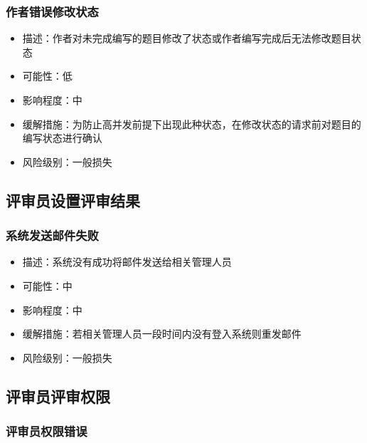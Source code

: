 \documentclass[hyperref, a4paper]{ctexart}
\providecommand{\tightlist}{%
  \setlength{\itemsep}{0pt}\setlength{\parskip}{0pt}}
\begin{document}
\hypertarget{ux4f5cux8005ux9519ux8befux4feeux6539ux72b6ux6001}{%
\subsubsection{作者错误修改状态}\label{ux4f5cux8005ux9519ux8befux4feeux6539ux72b6ux6001}}

\begin{itemize}
\tightlist
\item
  描述：作者对未完成编写的题目修改了状态或作者编写完成后无法修改题目状态
\item
  可能性：低
\item
  影响程度：中
\item
  缓解措施：为防止高并发前提下出现此种状态，在修改状态的请求前对题目的编写状态进行确认
\item
  风险级别：一般损失
\end{itemize}

\hypertarget{ux8bc4ux5ba1ux5458ux8bbeux7f6eux8bc4ux5ba1ux7ed3ux679c}{%
\subsection{评审员设置评审结果}\label{ux8bc4ux5ba1ux5458ux8bbeux7f6eux8bc4ux5ba1ux7ed3ux679c}}

\hypertarget{ux7cfbux7edfux53d1ux9001ux90aeux4ef6ux5931ux8d25-2}{%
\subsubsection{系统发送邮件失败}\label{ux7cfbux7edfux53d1ux9001ux90aeux4ef6ux5931ux8d25-2}}

\begin{itemize}
\tightlist
\item
  描述：系统没有成功将邮件发送给相关管理人员
\item
  可能性：中
\item
  影响程度：中
\item
  缓解措施：若相关管理人员一段时间内没有登入系统则重发邮件
\item
  风险级别：一般损失
\end{itemize}

\hypertarget{ux8bc4ux5ba1ux5458ux8bc4ux5ba1ux6743ux9650-1}{%
\subsection{评审员评审权限}\label{ux8bc4ux5ba1ux5458ux8bc4ux5ba1ux6743ux9650-1}}

\hypertarget{ux8bc4ux5ba1ux5458ux6743ux9650ux9519ux8bef}{%
\subsubsection{评审员权限错误}\label{ux8bc4ux5ba1ux5458ux6743ux9650ux9519ux8bef}}
\end{document}
